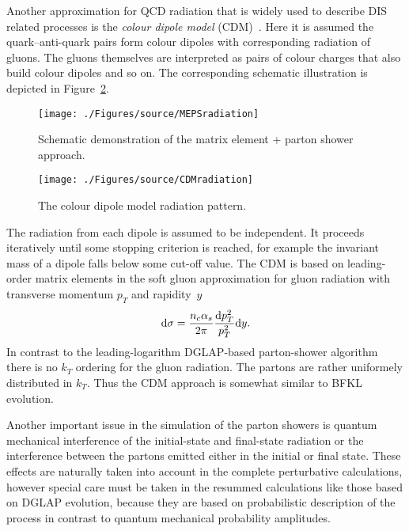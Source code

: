 Another approximation for QCD radiation that is widely used to describe DIS related processes is the \emph{colour dipole model} (CDM)~\cite{cdm}. Here it is assumed the quark--anti-quark pairs form colour dipoles with corresponding radiation of gluons. The gluons themselves are interpreted as pairs of colour charges that also build colour dipoles and so on. The corresponding schematic illustration is depicted in Figure~\ref{fig:cdm}. 
\begin{figure}[t]
	\centering
		\texttt{[image: ./Figures/source/MEPSradiation]}
	\caption{Schematic demonstration of the matrix element + parton shower approach.}
\label{fig:meps}
\end{figure}
\begin{figure}[t]%
\centering
\texttt{[image: ./Figures/source/CDMradiation]}%
\caption{The colour dipole model radiation pattern.}%
\label{fig:cdm}%
\end{figure}
The radiation from each dipole is assumed to be independent. It proceeds iteratively until some stopping criterion is reached, for example the invariant mass of a dipole falls below some cut-off  value. The CDM is based on leading-order matrix elements in the soft gluon approximation for gluon radiation with transverse momentum $p_T$ and rapidity~$y$
\begin{equation}
\mathrm{d}\sigma = \frac{n_c\mbox{$\alpha_{s}$}}{2\pi}\frac{\mathrm{d}p_T^2}{p_T^2}\mathrm{d}y.
\end{equation}
In contrast to the leading-logarithm DGLAP-based parton-shower algorithm there is no $k_T$ ordering for the gluon radiation. The partons are rather uniformely distributed in $k_T$. Thus the CDM approach is somewhat similar to BFKL evolution.

Another important issue in the simulation of the parton showers is quantum mechanical interference of the initial-state and final-state radiation or the interference between the partons emitted either in the initial or final state. These effects are naturally taken into account in the complete perturbative calculations, however special care must be taken in the resummed calculations like those based on DGLAP evolution, because they are based on probabilistic description of the process in contrast to quantum mechanical probability amplitudes.

